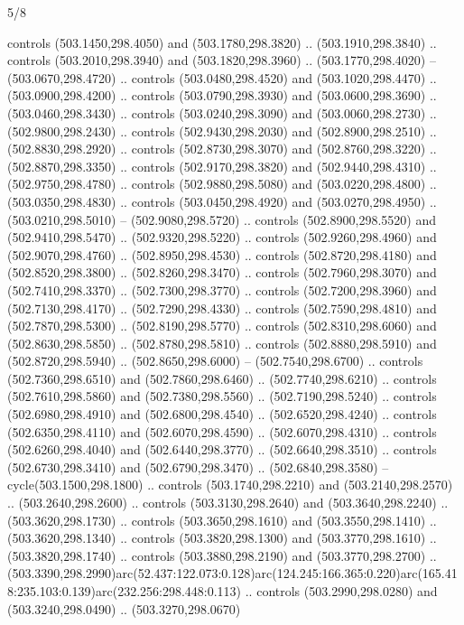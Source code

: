 \begin{flagdescription}{5/8}
\begin{scope}[xshift=0.5\flaglength,yshift=0.5\flagwidth,scale=\flagwidth/475.63]
\begin{scope}[y=0.8pt, x=0.8pt, yscale=-1, xscale=1,shift={(-450,-300)}]
\begin{scope}[cm={{1.0,0.0,0.0,1.0,(-0.0002,0.12556)}},cm={{1.0,0.0,0.0,1.0,(0.00179,0.0)}}]
\begin{scope}[cm={{1.11592,0.0,0.0,1.11592,(-106.89933,-41.77764)}}]
\begin{scope}[draw=black,fill=cfff]
\begin{scope}[fill=black]
  controls (503.1450,298.4050) and (503.1780,298.3820) .. (503.1910,298.3840) ..
  controls (503.2010,298.3940) and (503.1820,298.3960) .. (503.1770,298.4020) --
  (503.0670,298.4720) .. controls (503.0480,298.4520) and (503.1020,298.4470) ..
  (503.0900,298.4200) .. controls (503.0790,298.3930) and (503.0600,298.3690) ..
  (503.0460,298.3430) .. controls (503.0240,298.3090) and (503.0060,298.2730) ..
  (502.9800,298.2430) .. controls (502.9430,298.2030) and (502.8900,298.2510) ..
  (502.8830,298.2920) .. controls (502.8730,298.3070) and (502.8760,298.3220) ..
  (502.8870,298.3350) .. controls (502.9170,298.3820) and (502.9440,298.4310) ..
  (502.9750,298.4780) .. controls (502.9880,298.5080) and (503.0220,298.4800) ..
  (503.0350,298.4830) .. controls (503.0450,298.4920) and (503.0270,298.4950) ..
  (503.0210,298.5010) -- (502.9080,298.5720) .. controls (502.8900,298.5520) and
  (502.9410,298.5470) .. (502.9320,298.5220) .. controls (502.9260,298.4960) and
  (502.9070,298.4760) .. (502.8950,298.4530) .. controls (502.8720,298.4180) and
  (502.8520,298.3800) .. (502.8260,298.3470) .. controls (502.7960,298.3070) and
  (502.7410,298.3370) .. (502.7300,298.3770) .. controls (502.7200,298.3960) and
  (502.7130,298.4170) .. (502.7290,298.4330) .. controls (502.7590,298.4810) and
  (502.7870,298.5300) .. (502.8190,298.5770) .. controls (502.8310,298.6060) and
  (502.8630,298.5850) .. (502.8780,298.5810) .. controls (502.8880,298.5910) and
  (502.8720,298.5940) .. (502.8650,298.6000) -- (502.7540,298.6700) .. controls
  (502.7360,298.6510) and (502.7860,298.6460) .. (502.7740,298.6210) .. controls
  (502.7610,298.5860) and (502.7380,298.5560) .. (502.7190,298.5240) .. controls
  (502.6980,298.4910) and (502.6800,298.4540) .. (502.6520,298.4240) .. controls
  (502.6350,298.4110) and (502.6070,298.4590) .. (502.6070,298.4310) .. controls
  (502.6260,298.4040) and (502.6440,298.3770) .. (502.6640,298.3510) .. controls
  (502.6730,298.3410) and (502.6790,298.3470) .. (502.6840,298.3580) --
  cycle(503.1500,298.1800) .. controls (503.1740,298.2210) and
  (503.2140,298.2570) .. (503.2640,298.2600) .. controls (503.3130,298.2640) and
  (503.3640,298.2240) .. (503.3620,298.1730) .. controls (503.3650,298.1610) and
  (503.3550,298.1410) .. (503.3620,298.1340) .. controls (503.3820,298.1300) and
  (503.3770,298.1610) .. (503.3820,298.1740) .. controls (503.3880,298.2190) and
  (503.3770,298.2700) ..
  (503.3390,298.2990)arc(52.437:122.073:0.128)arc(124.245:166.365:0.220)arc(165.418:235.103:0.139)arc(232.256:298.448:0.113)
  .. controls (503.2990,298.0280) and (503.3240,298.0490) .. (503.3270,298.0670)

\end{scope}
\end{scope}
\end{scope}
\end{scope}
\end{scope}
\end{scope}
\end{flagdescription}
